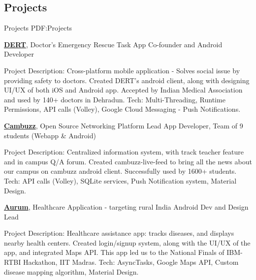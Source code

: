 \documentclass[letterpaper,10pt,oneside]{article}
\begin{document}
\begin{body}

\section
{Projects}
{Projects}
{PDF:Projects}

\Gap
\href{https://play.google.com/store/apps/details?id=com.dert}
{\textbf{DERT}}, Doctor's Emergency Rescue Task App
\hfill
{}
\GapNoBreak
\BulletItem
Co-founder and Android Developer
\begin{detail}
\SubBulletItem
Project Description: Cross-platform mobile application - Solves social issue by providing safety to doctors.
\SubBulletItem
Created DERT's android client, along with designing UI/UX of both iOS and Android app.
\SubBulletItem
Accepted by Indian Medical Association and used by 140+ doctors in Dehradun.
\SubBulletItem
Tech: Multi-Threading, Runtime Permissions, API calls (Volley), Google Cloud Messaging - Push Notifications.   
\end{detail}

\Gap 
\href{https://play.google.com/store/apps/details?id=com.cambuzz.internetcabin.cambuzzvitcc}
{\textbf{Cambuzz}}, Open Source Networking Platform
\hfill
{}
\GapNoBreak
\BulletItem
Lead App Developer, Team of 9 students (Webapp \& Android)
\begin{detail}
\SubBulletItem
Project Description: Centralized information system, with track teacher feature and in campus Q/A forum.
\SubBulletItem
Created cambuzz-live-feed to bring all the news about our campus on cambuzz android client.
\SubBulletItem
Successfully used by 1600+ students.
\SubBulletItem
Tech: API calls (Volley), SQLite services, Push Notification system, Material Design.
\end{detail}

\Gap
\href{https://play.google.com/store/apps/details?id=com.iotaconcepts.aurum&hl=en}
{\textbf{Aurum}}, Healthcare Application - targeting rural India
\hfill
{}
\GapNoBreak
\BulletItem
Android Dev and Design Lead
\begin{detail}
\SubBulletItem
Project Description: Healthcare assistance app: tracks diseases, and displays nearby health centers. 
\SubBulletItem
Created login/signup system, along with the UI/UX of the app, and integrated Maps API.
\SubBulletItem
This app led us to the National Finals of IBM-RTBI Hackathon, IIT Madras.
\SubBulletItem
Tech: AsyncTasks, Google Maps API, Custom disease mapping algorithm, Material Design.
\end{detail}



\end{body}
\end{document}
